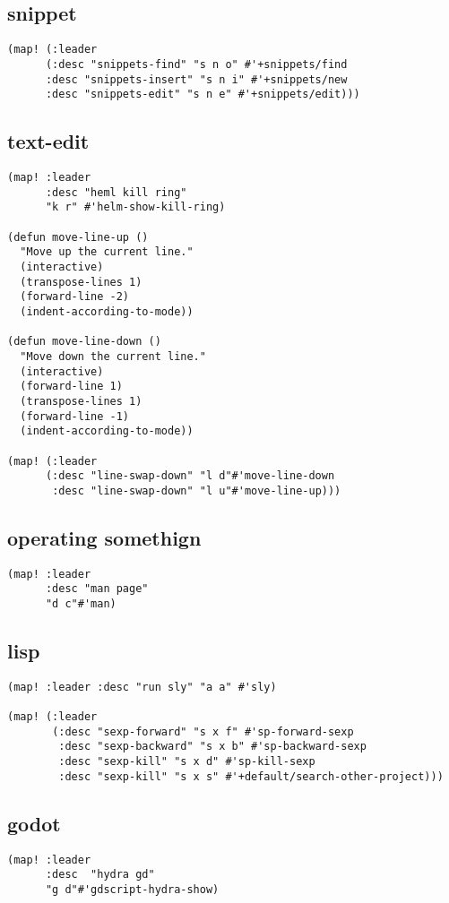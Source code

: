 \documentclass[11pt]{article}
\begin{document}
\subsection{snippet}
\label{sec:orgf1a9610}
\begin{verbatim}
(map! (:leader
      (:desc "snippets-find" "s n o" #'+snippets/find
      :desc "snippets-insert" "s n i" #'+snippets/new
      :desc "snippets-edit" "s n e" #'+snippets/edit)))
\end{verbatim}
\subsection{text-edit}
\label{sec:org7ff8cbe}
\begin{verbatim}
(map! :leader
      :desc "heml kill ring"
      "k r" #'helm-show-kill-ring)

(defun move-line-up ()
  "Move up the current line."
  (interactive)
  (transpose-lines 1)
  (forward-line -2)
  (indent-according-to-mode))

(defun move-line-down ()
  "Move down the current line."
  (interactive)
  (forward-line 1)
  (transpose-lines 1)
  (forward-line -1)
  (indent-according-to-mode))

(map! (:leader
      (:desc "line-swap-down" "l d"#'move-line-down
       :desc "line-swap-down" "l u"#'move-line-up)))
\end{verbatim}
\subsection{operating somethign}
\label{sec:org8a90b4e}
\begin{verbatim}
(map! :leader
      :desc "man page"
      "d c"#'man)
\end{verbatim}

\subsection{lisp}
\label{sec:orgc92d6fb}
\begin{verbatim}
(map! :leader :desc "run sly" "a a" #'sly)

(map! (:leader
       (:desc "sexp-forward" "s x f" #'sp-forward-sexp
        :desc "sexp-backward" "s x b" #'sp-backward-sexp
        :desc "sexp-kill" "s x d" #'sp-kill-sexp
        :desc "sexp-kill" "s x s" #'+default/search-other-project)))
\end{verbatim}

\subsection{godot}
\label{sec:orge3d9137}
\begin{verbatim}
(map! :leader
      :desc  "hydra gd"
      "g d"#'gdscript-hydra-show)

\end{verbatim}
\end{document}
